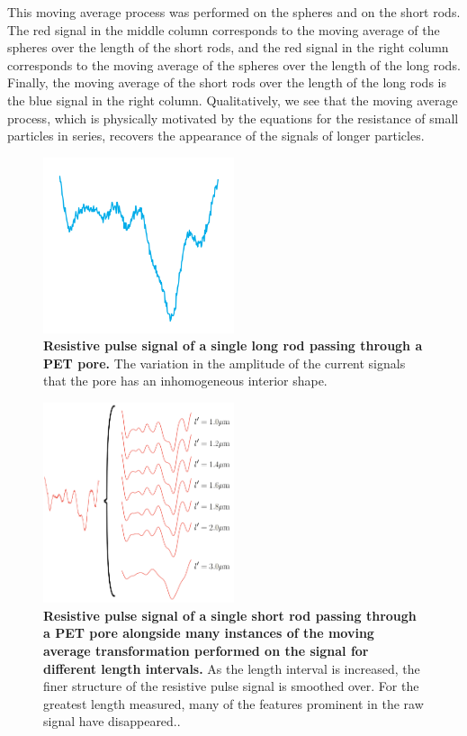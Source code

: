 		This moving average process was performed on the spheres and on the short rods. The red signal in the middle column corresponds to the moving average of the spheres over the length of the short rods, and the red signal in the right column corresponds to the moving average of the spheres over the length of the long rods. Finally, the moving average of the short rods over the length of the long rods is the blue signal in the right column. Qualitatively, we see that the moving average process, which is physically motivated by the equations for the resistance of small particles in series, recovers the appearance of the signals of longer particles. 
		
		\begin{figure}
			\includegraphics[width=0.5\textwidth]{longevent.png}
			\caption{\textbf{Resistive pulse signal of a single long rod passing through a PET pore.} The variation in the amplitude of the current signals that the pore has an inhomogeneous interior shape.}
			\label{fig:longevent}
		\end{figure}

		
		\begin{figure}
			\includegraphics[width=0.5\textwidth]{experimentaldtwfits.png}
			\caption{\textbf{Resistive pulse signal of a single short rod passing through a PET pore alongside many instances of the moving average transformation performed on the signal for different length intervals.} As the length interval is increased, the finer structure of the resistive pulse signal is smoothed over. For the greatest length measured, many of the features prominent in the raw signal have disappeared..}
			\label{fig:experimentaldtwfits}
		\end{figure}
		

